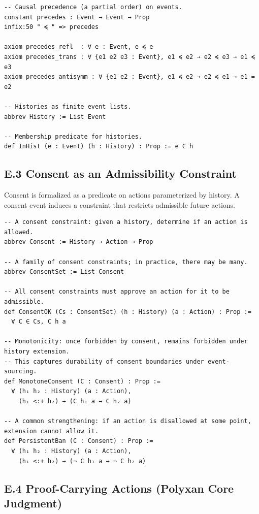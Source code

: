 \documentclass[11pt,oneside]{article}
\begin{document}
\begin{verbatim}
-- Causal precedence (a partial order) on events.
constant precedes : Event → Event → Prop
infix:50 " ≼ " => precedes

axiom precedes_refl  : ∀ e : Event, e ≼ e
axiom precedes_trans : ∀ {e1 e2 e3 : Event}, e1 ≼ e2 → e2 ≼ e3 → e1 ≼ e3
axiom precedes_antisymm : ∀ {e1 e2 : Event}, e1 ≼ e2 → e2 ≼ e1 → e1 = e2

-- Histories as finite event lists.
abbrev History := List Event

-- Membership predicate for histories.
def InHist (e : Event) (h : History) : Prop := e ∈ h
\end{verbatim}

\subsection{E.3 Consent as an Admissibility Constraint}

Consent is formalized as a predicate on actions parameterized by history. A consent event induces a constraint that restricts admissible future actions.

\begin{verbatim}
-- A consent constraint: given a history, determine if an action is allowed.
abbrev Consent := History → Action → Prop

-- A family of consent constraints; in practice, there may be many.
abbrev ConsentSet := List Consent

-- All consent constraints must approve an action for it to be admissible.
def ConsentOK (Cs : ConsentSet) (h : History) (a : Action) : Prop :=
  ∀ C ∈ Cs, C h a

-- Monotonicity: once forbidden by consent, remains forbidden under history extension.
-- This captures durability of consent boundaries under event-sourcing.
def MonotoneConsent (C : Consent) : Prop :=
  ∀ (h₁ h₂ : History) (a : Action),
    (h₁ <:+ h₂) → (C h₁ a → C h₂ a)

-- A common strengthening: if an action is disallowed at some point, extension cannot allow it.
def PersistentBan (C : Consent) : Prop :=
  ∀ (h₁ h₂ : History) (a : Action),
    (h₁ <:+ h₂) → (¬ C h₁ a → ¬ C h₂ a)
\end{verbatim}

\subsection{E.4 Proof-Carrying Actions (Polyxan Core Judgment)}
\end{document}
